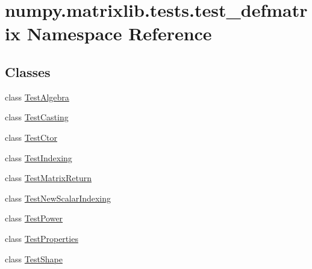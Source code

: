 \hypertarget{namespacenumpy_1_1matrixlib_1_1tests_1_1test__defmatrix}{}\section{numpy.\+matrixlib.\+tests.\+test\+\_\+defmatrix Namespace Reference}
\label{namespacenumpy_1_1matrixlib_1_1tests_1_1test__defmatrix}
\subsection*{Classes}
\begin{DoxyCompactItemize}
\item 
class \hyperlink{classnumpy_1_1matrixlib_1_1tests_1_1test__defmatrix_1_1TestAlgebra}{Test\+Algebra}
\item 
class \hyperlink{classnumpy_1_1matrixlib_1_1tests_1_1test__defmatrix_1_1TestCasting}{Test\+Casting}
\item 
class \hyperlink{classnumpy_1_1matrixlib_1_1tests_1_1test__defmatrix_1_1TestCtor}{Test\+Ctor}
\item 
class \hyperlink{classnumpy_1_1matrixlib_1_1tests_1_1test__defmatrix_1_1TestIndexing}{Test\+Indexing}
\item 
class \hyperlink{classnumpy_1_1matrixlib_1_1tests_1_1test__defmatrix_1_1TestMatrixReturn}{Test\+Matrix\+Return}
\item 
class \hyperlink{classnumpy_1_1matrixlib_1_1tests_1_1test__defmatrix_1_1TestNewScalarIndexing}{Test\+New\+Scalar\+Indexing}
\item 
class \hyperlink{classnumpy_1_1matrixlib_1_1tests_1_1test__defmatrix_1_1TestPower}{Test\+Power}
\item 
class \hyperlink{classnumpy_1_1matrixlib_1_1tests_1_1test__defmatrix_1_1TestProperties}{Test\+Properties}
\item 
class \hyperlink{classnumpy_1_1matrixlib_1_1tests_1_1test__defmatrix_1_1TestShape}{Test\+Shape}
\end{DoxyCompactItemize}
